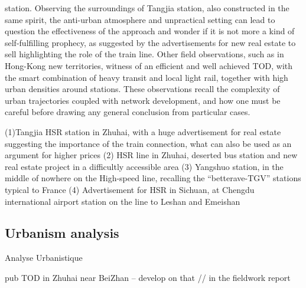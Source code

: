 station. Observing the surroundings of Tangjia station, also constructed in the same spirit, the anti-urban atmosphere and unpractical setting can lead to question the effectiveness of the approach and wonder if it is not more a kind of self-fulfilling prophecy, as suggested by the advertisements for new real estate to sell highlighting the role of the train line. Other field observations, such as in Hong-Kong new territories, witness of an efficient and well achieved TOD, with the smart combination of heavy transit and local light rail, together with high urban densities around stations. These observations recall the complexity of urban trajectories coupled with network development, and how one must be careful before drawing any general conclusion from particular cases.





(1)Tangjia HSR station in Zhuhai, with a huge advertisement for real estate suggesting the importance of the train connection, what can also be used as an argument for higher prices 
(2) HSR line in Zhuhai, deserted bus station and new real estate project in a difficultly accessible area 
(3) Yangshuo station, in the middle of nowhere on the High-speed line, recalling the “betterave-TGV” stations typical to France
(4) Advertisement for HSR in Sichuan, at Chengdu international airport station on the line to Leshan and Emeishan



\subsection{Urbanism analysis}{Analyse Urbanistique}



pub TOD in Zhuhai near BeiZhan -- develop on that // in the fieldwork report















